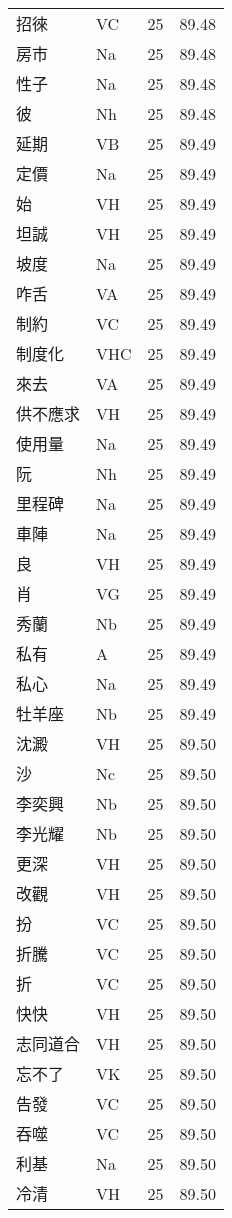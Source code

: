 \documentclass[twocolumn]{book}
\begin{document}
\begin{supertabular}{llrr}
招徠 & VC & 25 &  89.48\\
房市 & Na & 25 &  89.48\\
性子 & Na & 25 &  89.48\\
彼 & Nh & 25 &  89.48\\
延期 & VB & 25 &  89.49\\
定價 & Na & 25 &  89.49\\
始 & VH & 25 &  89.49\\
坦誠 & VH & 25 &  89.49\\
坡度 & Na & 25 &  89.49\\
咋舌 & VA & 25 &  89.49\\
制約 & VC & 25 &  89.49\\
制度化 & VHC & 25 &  89.49\\
來去 & VA & 25 &  89.49\\
供不應求 & VH & 25 &  89.49\\
使用量 & Na & 25 &  89.49\\
阮 & Nh & 25 &  89.49\\
里程碑 & Na & 25 &  89.49\\
車陣 & Na & 25 &  89.49\\
良 & VH & 25 &  89.49\\
肖 & VG & 25 &  89.49\\
秀蘭 & Nb & 25 &  89.49\\
私有 & A & 25 &  89.49\\
私心 & Na & 25 &  89.49\\
牡羊座 & Nb & 25 &  89.49\\
沈澱 & VH & 25 &  89.50\\
沙 & Nc & 25 &  89.50\\
李奕興 & Nb & 25 &  89.50\\
李光耀 & Nb & 25 &  89.50\\
更深 & VH & 25 &  89.50\\
改觀 & VH & 25 &  89.50\\
扮 & VC & 25 &  89.50\\
折騰 & VC & 25 &  89.50\\
折 & VC & 25 &  89.50\\
快快 & VH & 25 &  89.50\\
志同道合 & VH & 25 &  89.50\\
忘不了 & VK & 25 &  89.50\\
告發 & VC & 25 &  89.50\\
吞噬 & VC & 25 &  89.50\\
利基 & Na & 25 &  89.50\\
冷清 & VH & 25 &  89.50\\

\end{supertabular}
\end{document}
